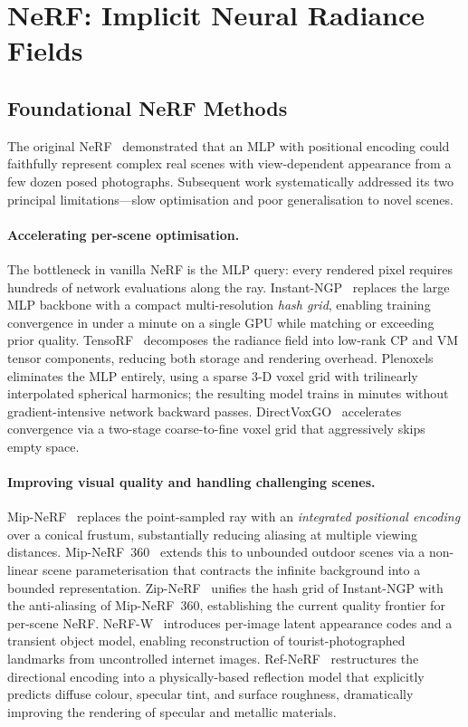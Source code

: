 \section{NeRF: Implicit Neural Radiance Fields}
\label{sec:nerf}

\subsection{Foundational NeRF Methods}

The original NeRF~\citep{mildenhall2020nerf} demonstrated that an MLP with
positional encoding could faithfully represent complex real scenes with
view-dependent appearance from a few dozen posed photographs.
Subsequent work systematically addressed its two principal limitations---slow
optimisation and poor generalisation to novel scenes.

\paragraph{Accelerating per-scene optimisation.}
The bottleneck in vanilla NeRF is the MLP query: every rendered pixel
requires hundreds of network evaluations along the ray.
Instant-NGP~\citep{muller2022instant} replaces the large MLP backbone with a
compact multi-resolution \emph{hash grid}, enabling training convergence in
under a minute on a single GPU while matching or exceeding prior quality.
TensoRF~\citep{chen2022tensorf} decomposes the radiance field into low-rank
CP and VM tensor components, reducing both storage and rendering overhead.
Plenoxels~\citep{fridovich2022plenoxels} eliminates the MLP entirely,
using a sparse 3-D voxel grid with trilinearly interpolated spherical harmonics;
the resulting model trains in minutes without gradient-intensive network
backward passes.
DirectVoxGO~\citep{sun2022dvgo} accelerates convergence via a two-stage
coarse-to-fine voxel grid that aggressively skips empty space.

\paragraph{Improving visual quality and handling challenging scenes.}
Mip-NeRF~\citep{barron2021mipnerf} replaces the point-sampled ray with an
\emph{integrated positional encoding} over a conical frustum, substantially
reducing aliasing at multiple viewing distances.
Mip-NeRF~360~\citep{barron2022mipnerf360} extends this to unbounded outdoor
scenes via a non-linear scene parameterisation that contracts the infinite
background into a bounded representation.
Zip-NeRF~\citep{barron2023zipnerf} unifies the hash grid of Instant-NGP with
the anti-aliasing of Mip-NeRF~360, establishing the current quality frontier
for per-scene NeRF.
NeRF-W~\citep{martinbrualla2021nerfw} introduces per-image latent appearance
codes and a transient object model, enabling reconstruction of tourist-photographed
landmarks from uncontrolled internet images.
Ref-NeRF~\citep{verbin2022refnerf} restructures the directional encoding into
a physically-based reflection model that explicitly predicts diffuse colour,
specular tint, and surface roughness, dramatically improving the rendering of
specular and metallic materials.

